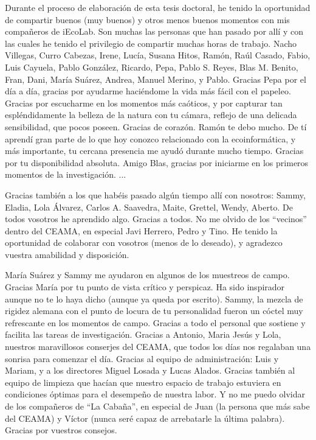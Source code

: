 Durante el proceso de elaboración de esta tesis doctoral, he tenido la oportunidad de compartir buenos (muy buenos) y otros menos buenos momentos con mis compañeros de iEcoLab. Son muchas las personas que han pasado por allí y con las cuales he tenido el privilegio de compartir muchas horas de trabajo. Nacho Villegas, Curro Cabezas, Irene, Lucía, Susana Hitos, Ramón, Raúl Casado, Fabio, Luis Cayuela, Pablo González, Ricardo, Pepa, Pablo S. Reyes, Blas M. Benito, Fran, Dani, María Suárez, Andrea, Manuel Merino, y Pablo. Gracias Pepa por el día a día, gracias por ayudarme haciéndome la vida más fácil con el papeleo. Gracias por escucharme en los momentos más caóticos, y por capturar tan espléndidamente la belleza de la natura con tu cámara, reflejo de una delicada sensibilidad, que pocos poseen. Gracias de corazón. Ramón te debo mucho. De tí aprendí gran parte de lo que hoy conozco relacionado con la ecoinformática, y más importante, tu cercana presencia me ayudó durante mucho tiempo. Gracias por tu disponibilidad absoluta. Amigo Blas, gracias por iniciarme en los primeros momentos de la investigación. ... 


Gracias también a los que habéis pasado algún tiempo allí con nosotros: Sammy, Eladia, Lola Álvarez, Carlos A. Saavedra, Maite, Grettel, Wendy, Aberto. De todos vosotros he aprendido algo. Gracias a todos. No me olvido de los “vecinos” dentro del CEAMA, en especial Javi Herrero, Pedro y Tino. He tenido la oportunidad de colaborar con vosotros (menos de lo deseado), y agradezco vuestra amabilidad y disposición. 




María Suárez y Sammy me ayudaron en algunos de los muestreos de campo. Gracias María por tu punto de vista crítico y perspicaz. Ha sido inspirador aunque no te lo haya dicho (aunque ya queda por escrito). Sammy, la mezcla de rigidez alemana con el punto de locura de tu personalidad fueron un cóctel muy refrescante en los momentos de campo. Gracias a todo el personal que sostiene y facilita las tareas de investigación. Gracias a Antonio, Maria Jesús y Lola, nuestros maravillosos conserjes del CEAMA, que todos los días nos regalaban una sonrisa para comenzar el día. Gracias al equipo de administración: Luis y Mariam, y a los directores Miguel Losada y Lucas Alados. Gracias también al equipo de limpieza que hacían que nuestro espacio de trabajo estuviera en condiciones óptimas para el desempeño de nuestra labor. Y no me puedo olvidar de los compañeros de “La Cabaña”, en especial de Juan (la persona que más sabe del CEAMA) y Víctor (nunca seré capaz de arrebatarle la última palabra). Gracias por vuestros consejos. 

